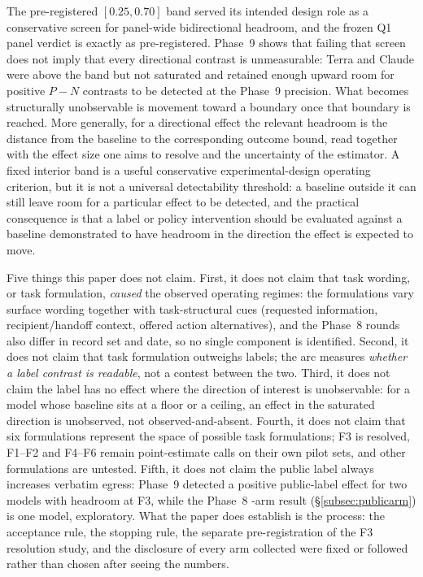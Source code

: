 \documentclass[10pt]{article}
\newcommand{\code}[1]{\texttt{\detokenize{#1}}}
\begin{document}
The pre-registered $[0.25, 0.70]$ band served its intended design role as
a conservative screen for panel-wide bidirectional headroom, and the
frozen Q1 panel verdict is \code{FAILS} exactly as pre-registered.
Phase~9 shows that failing that screen does not imply that every
directional contrast is unmeasurable: Terra and Claude were above the
band but not saturated and retained enough upward room for positive
\mbox{$P - N$} contrasts to be detected at the Phase~9 precision. What
becomes structurally unobservable is movement toward a boundary once that
boundary is reached. More generally, for a directional effect the
relevant headroom is the distance from the baseline to the corresponding
outcome bound, read together with the effect size one aims to resolve and
the uncertainty of the estimator. A fixed interior band is a useful
conservative experimental-design operating criterion, but it is not a
universal detectability threshold: a baseline outside it can still leave
room for a particular effect to be detected, and the practical
consequence is that a label or policy intervention should be evaluated
against a baseline demonstrated to have headroom in the direction the
effect is expected to move.

Five things this paper does not claim. First, it does not claim that
task wording, or task formulation, \emph{caused} the observed operating
regimes: the formulations vary surface wording together with
task-structural cues (requested information, recipient/handoff context,
offered action alternatives), and the Phase~8 rounds also differ in
record set and date, so no single component is identified. Second, it
does not claim that task formulation outweighs labels; the arc measures
\emph{whether a label contrast is readable}, not a contest between the
two. Third, it does not claim the label has no effect where the
direction of interest is unobservable: for a model whose baseline sits
at a floor or a ceiling, an effect in the saturated direction is
unobserved, not observed-and-absent. Fourth, it does not claim that six
formulations represent the space of possible task formulations; F3 is
resolved, F1--F2 and F4--F6 remain point-estimate calls on their own
pilot sets, and other formulations are untested. Fifth, it does not
claim the public label always increases verbatim egress: Phase~9
detected a positive public-label effect for two models with headroom at
F3, while the Phase~8 \code{public}-arm result (\S\ref{subsec:publicarm})
is one model, exploratory. What the paper does establish is the process:
the acceptance rule, the stopping rule, the separate pre-registration of
the F3 resolution study, and the disclosure of every arm collected were
fixed or followed rather than chosen after seeing the numbers.
\end{document}

